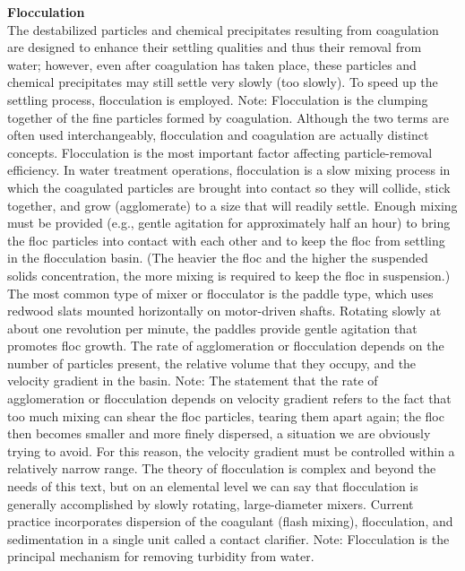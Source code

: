 \textbf{Flocculation}\\
The destabilized particles and chemical precipitates resulting from coagulation are designed to enhance their settling qualities and thus their removal from water; however, even after coagulation has taken place, these particles and chemical precipitates may still settle very slowly (too slowly). To speed up the settling process, flocculation is employed.
Note: Flocculation is the clumping together of the fine particles formed by coagulation. Although the two terms are often used interchangeably, flocculation and coagulation are actually distinct concepts.
Flocculation is the most important factor affecting particle-removal efficiency. In water treatment operations, flocculation is a slow mixing process in which the coagulated particles are brought into contact so they will collide, stick together, and grow (agglomerate) to a size that will readily settle. Enough mixing must be provided (e.g., gentle agitation for approximately half an hour) to bring the floc particles into contact with each other and to keep the floc from settling in the flocculation basin. (The heavier the floc and the higher the suspended solids concentration, the more mixing is required to keep the floc in suspension.) The most common type of mixer or flocculator is the paddle type, which uses redwood slats mounted horizontally on motor-driven shafts. Rotating slowly at about one revolution per minute, the paddles provide gentle agitation that promotes floc growth. The rate of agglomeration or flocculation depends on the number of particles present, the relative volume that they occupy, and the velocity gradient in the basin.  Note: The statement that the rate of agglomeration or flocculation depends on velocity gradient refers to the fact that too much mixing can shear the floc particles, tearing them apart again; the floc then becomes smaller and more finely dispersed, a situation we are obviously trying to avoid. For this reason, the velocity gradient must be controlled within a relatively narrow range.
The theory of flocculation is complex and beyond the needs of this text, but on an elemental level we can say that flocculation is generally accomplished by slowly rotating, large-diameter mixers. Current practice incorporates dispersion of the coagulant (flash mixing), flocculation, and sedimentation in a single unit called a contact clarifier.
Note: Flocculation is the principal mechanism for removing turbidity from water.

